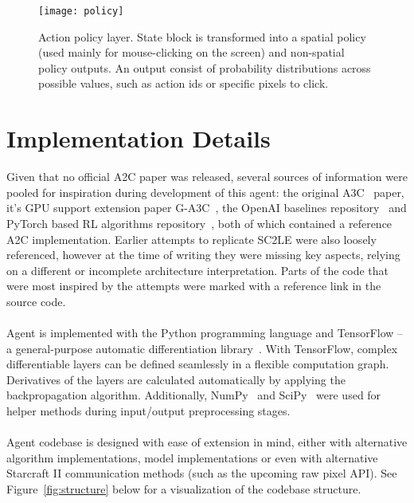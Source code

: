 \begin{figure}[ht]
\begin{center}
\texttt{[image: policy]}
\caption{Action policy layer. State block is transformed into a spatial policy (used mainly for mouse-clicking on the screen) and non-spatial policy outputs. An output consist of probability distributions across possible values, such as action ids or specific pixels to click.}
\label{fig:policy}
\end{center}
\end{figure}

\section{Implementation Details}

Given that no official A2C paper was released, several sources of information were pooled for inspiration during development of this agent: the original A3C~\cite{mnih16} paper, it’s GPU support extension paper G-A3C~\cite{babaeizadeh2017ga3c}, the OpenAI baselines repository~\cite{baselines} and PyTorch based RL algorithms repository~\cite{pytorchrl}, both of which contained a reference A2C implementation. Earlier attempts to replicate SC2LE were also loosely referenced, however at the time of writing they were missing key aspects, relying on a different or incomplete architecture interpretation. Parts of the code that were most inspired by the attempts were marked with a reference link in the source code.
\\\\
Agent is implemented with the Python programming language and TensorFlow -- a general-purpose automatic differentiation library~\cite{Abadi2016}. With TensorFlow, complex differentiable layers can be defined seamlessly in a flexible computation graph. Derivatives of the layers are calculated automatically by applying the backpropagation algorithm. Additionally, NumPy~\cite{Oliphant2015} and SciPy~\cite{Jones2001} were used for helper methods during input/output preprocessing stages.
\\\\
Agent codebase is designed with ease of extension in mind, either with alternative algorithm implementations, model implementations or even with alternative Starcraft II communication methods (such as the upcoming raw pixel API). See Figure~\ref{fig:structure} below for a visualization of the codebase structure.
\\\\

